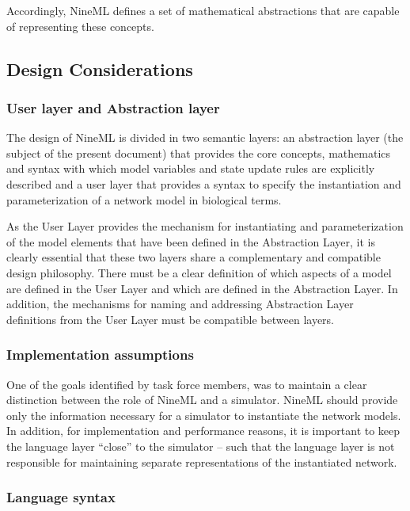\documentclass[a4paper]{article}
\begin{document}
Accordingly, NineML defines a set of mathematical abstractions that
are capable of representing these concepts.

\subsection{Design Considerations}


\subsubsection{User layer and Abstraction layer}

The design of NineML is divided in two semantic layers: an abstraction
layer (the subject of the present document) that provides the core
concepts, mathematics and syntax with which model variables and state
update rules are explicitly described and a user layer that provides a
syntax to specify the instantiation and parameterization of a network
model in biological terms.

As the User Layer provides the mechanism for instantiating and
parameterization of the model elements that have been defined in the
Abstraction Layer, it is clearly essential that these two layers share
a complementary and compatible design philosophy. There must be a
clear definition of which aspects of a model are defined in the User
Layer and which are defined in the Abstraction Layer. In addition, the
mechanisms for naming and addressing Abstraction Layer definitions
from the User Layer must be compatible between layers.
 
\subsubsection{Implementation assumptions}

One of the goals identified by task force members, was to maintain a
clear distinction between the role of NineML and a simulator. NineML
should provide only the information necessary for a simulator to
instantiate the network models. In addition, for implementation and
performance reasons, it is important to keep the language layer
“close” to the simulator – such that the language layer is not
responsible for maintaining separate representations of the
instantiated network.  

\subsubsection{Language syntax}
\end{document}
